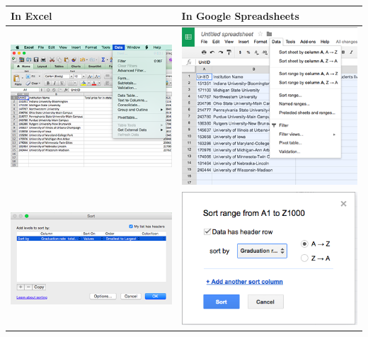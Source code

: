 \documentclass[]{book}
\begin{document}
\begin{longtable}[]{@{}ll@{}}
\toprule
In Excel & In Google Spreadsheets\tabularnewline
\midrule
\endhead
\includegraphics{images/excelsort1.png} & \includegraphics{images/googlesort1.png}\tabularnewline
\includegraphics{images/excelsort2.png} & \includegraphics{images/googlesort2.png}\tabularnewline
\bottomrule
\end{longtable}
\end{document}
